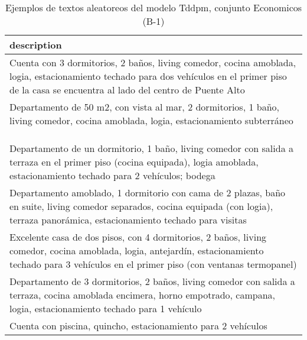 \begin{table}[H]
\centering
\fontsize{8}{14}\selectfont
\caption{Ejemplos de textos aleatoreos del modelo Tddpm, conjunto Economicos (B-1)}
\label{table-sample10-economicos-b-1-tddpm_mlp-text}
\begin{tabular}{|m{50em}|}
\hline
\rowcolor[gray]{0.8}
description \\
\hline Cuenta con 3 dormitorios, 2 baños, living comedor, cocina amoblada, logia, estacionamiento techado para dos vehículos en el primer piso de la casa se encuentra al lado del centro de Puente Alto \\
\hline Departamento de 50 m2, con vista al mar, 2 dormitorios, 1 baño, living comedor, cocina amoblada, logia, estacionamiento subterráneo \\
\hline  \\
\hline  \\
\hline  \\
\hline Departamento de un dormitorio, 1 baño, living comedor con salida a terraza en el primer piso (cocina equipada), logia amoblada, estacionamiento techado para 2 vehículos; bodega \\
\hline Departamento amoblado, 1 dormitorio con cama de 2 plazas, baño en suite, living comedor separados, cocina equipada (con logia), terraza panorámica, estacionamiento techado para visitas \\
\hline Excelente casa de dos pisos, con 4 dormitorios, 2 baños, living comedor, cocina amoblada, logia, antejardín, estacionamiento techado para 3 vehículos en el primer piso (con ventanas termopanel) \\
\hline Departamento de 3 dormitorios, 2 baños, living comedor con salida a terraza, cocina amoblada encimera, horno empotrado, campana, logia, estacionamiento techado para 1 vehículo \\
\hline Cuenta con piscina, quincho, estacionamiento para 2 vehículos \\
\hline
\end{tabular}
\end{table}
